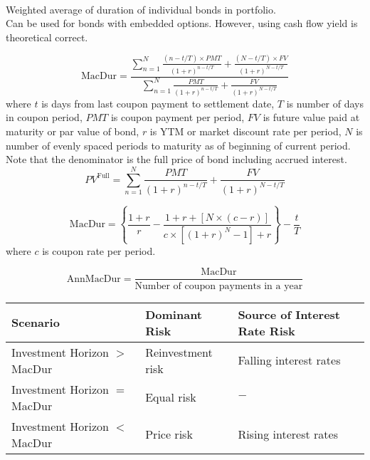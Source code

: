 \begin{definition} \\
Weighted average of duration of individual bonds in portfolio.\\
Can be used for bonds with embedded options. However, using cash flow yield is theoretical correct.
\end{definition}

\begin{definition} 
\begin{equation}
\text{MacDur} = \frac{\sum\limits_{n=1}^N \frac{(n - t/T) \times PMT}{(1+r)^{n - t/T}} + \frac{(N - t/T) \times FV}{(1+r)^{N - t/T}}}{\sum\limits_{n=1}^N \frac{PMT}{(1+r)^{n - t/T}} + \frac{FV}{(1+r)^{N - t/T}}} \nonumber
\end{equation}
where $t$ is days from last coupon payment to settlement date, $T$ is number of days in coupon period, $PMT$ is coupon payment per period, $FV$ is future value paid at maturity or par value of bond, $r$ is YTM or market discount rate per period, $N$ is number of evenly spaced periods to maturity as of beginning of current period.\\
Note that the denominator is the full price of bond including accrued interest.
\begin{equation}
PV^{\text{Full}} = \sum\limits_{n=1}^N \frac{PMT}{(1+r)^{n - t/T}} + \frac{FV}{(1+r)^{N - t/T}} \nonumber
\end{equation}
\end{definition}

\begin{definition} 
\begin{equation}
\text{MacDur} = \left\{\frac{1+r}{r} - \frac{1+r+[N \times (c-r)]}{c \times [(1+r)^N - 1] + r} \right\} - \frac{t}{T} \nonumber
\end{equation}
where $c$ is coupon rate per period.
\end{definition}

\begin{definition} 
\begin{equation}
\text{AnnMacDur} = \frac{\text{MacDur}}{\text{Number of coupon payments in a year}} \nonumber
\end{equation}
\end{definition}

\begin{flushleft}
\begin{tabularx}{\textwidth}{X|X|X}
\hline
\rowcolor{gray!30}
Scenario & Dominant Risk & Source of Interest Rate Risk \\
\hline
Investment Horizon $>$ MacDur & Reinvestment risk & Falling interest rates \\
\hline
Investment Horizon $=$ MacDur & Equal risk & $-$ \\
\hline
Investment Horizon $<$ MacDur & Price risk & Rising interest rates \\
\hline
\end{tabularx}
\end{flushleft}

